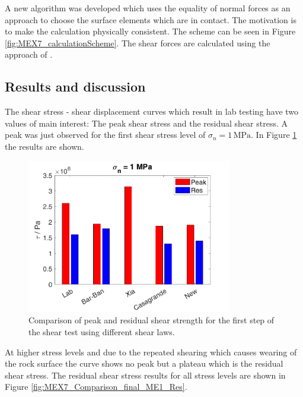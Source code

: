 A new algorithm was developed which uses the equality of normal forces as an approach to choose the surface elements which are in contact. The motivation is to make the calculation physically consistent. The scheme can be seen in Figure \ref{fig:MEX7_calculationScheme}. The shear forces are calculated using the approach of \cite{Casagrande2017}.
\subsection{Results and discussion}
The shear stress - shear displacement curves which result in lab testing have two values of main interest: The peak shear stress and the residual shear stress. A peak was just observed for the first shear stress level of $\sigma_n=1\,\text{MPa}$. In Figure \ref{fig:MEX7_Comparison_final_ME1_Peak} the results are shown. 

\begin{figure}[!ht]
\begin{center}
\includegraphics[width=0.8\textwidth]{./figures/MEX7_Comparison_final_Peak_Res_value_ME1.png}
\caption{Comparison of peak and residual shear strength for the first step of the shear test using different shear laws.}
\label{fig:MEX7_Comparison_final_ME1_Peak}
\end{center}
\end{figure}

At higher stress levels and due to the repeated shearing which causes wearing of the rock surface the curve shows no peak but a plateau which is the residual shear stress. The residual shear stress results for all stress levels are shown in Figure \ref{fig:MEX7_Comparison_final_ME1_Res}.

